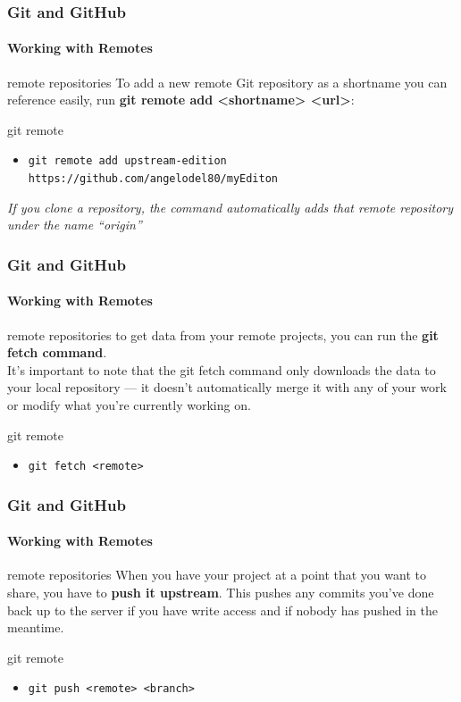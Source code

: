 \begin{frame}
	\frametitle{Git and GitHub}
    \framesubtitle{Working with Remotes}
    \addtocounter{nframe}{1}

	\begin{block}{remote repositories}
		To add a new remote Git repository as a shortname you can reference easily, run \textbf{git remote add <shortname> <url>}:
	\end{block}

	\begin{block}{git remote}
		\begin{itemize}
			\item \texttt{git remote add upstream-edition https://github.com/angelodel80/myEditon}
		\end{itemize}
	\end{block}

	\textit{If you clone a repository, the command automatically adds that remote repository under the name “origin”}

\end{frame}

\begin{frame}
	\frametitle{Git and GitHub}
    \framesubtitle{Working with Remotes}
    \addtocounter{nframe}{1}

	\begin{block}{remote repositories}
		to get data from your remote projects, you can run the \textbf{git fetch command}. \\
		It’s important to note that the git fetch command only downloads the data to your local repository — it doesn't automatically merge it with any of your work or modify what you’re currently working on.
	\end{block}

	\begin{block}{git remote}
		\begin{itemize}
			\item \texttt{git fetch <remote>}
		\end{itemize}
	\end{block}

\end{frame}

\begin{frame}
	\frametitle{Git and GitHub}
    \framesubtitle{Working with Remotes}
    \addtocounter{nframe}{1}

	\begin{block}{remote repositories}
		When you have your project at a point that you want to share, you have to \textbf{push it upstream}. This pushes any commits you’ve done back up to the server if you have write access and if nobody has pushed in the meantime.
	\end{block}

	\begin{block}{git remote}
		\begin{itemize}
			\item \texttt{git push <remote> <branch>}
		\end{itemize}
	\end{block}

\end{frame}

